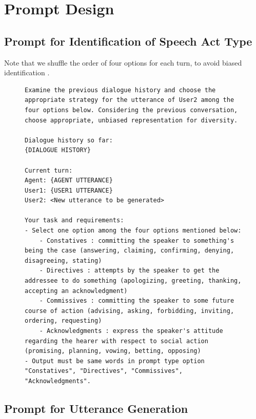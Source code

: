 \newpage
\onecolumn
\section{Prompt Design}
\label{app:prompt}

\subsection{Prompt for Identification of Speech Act Type}
\label{app:prompt-identification}

Note that we shuffle the order of four options for each turn, to avoid biased identification \cite{lu2022fantastically}.

\begin{figure}[h]
    \centering
\begin{lstlisting}
Examine the previous dialogue history and choose the appropriate strategy for the utterance of User2 among the four options below. Considering the previous conversation, choose appropriate, unbiased representation for diversity.

Dialogue history so far:
{DIALOGUE HISTORY}

Current turn:
Agent: {AGENT UTTERANCE}
User1: {USER1 UTTERANCE}
User2: <New utterance to be generated>

Your task and requirements:
- Select one option among the four options mentioned below: 
    - Constatives : committing the speaker to something's being the case (answering, claiming, confirming, denying, disagreeing, stating)
    - Directives : attempts by the speaker to get the addressee to do something (apologizing, greeting, thanking, accepting an acknowledgment)
    - Commissives : committing the speaker to some future course of action (advising, asking, forbidding, inviting, ordering, requesting)
    - Acknowledgments : express the speaker's attitude regarding the hearer with respect to social action (promising, planning, vowing, betting, opposing)
- Output must be same words in prompt type option "Constatives", "Directives", "Commissives", "Acknowledgments".

\end{lstlisting}
\end{figure}

\subsection{Prompt for Utterance Generation}
\label{app:prompt-generation}

